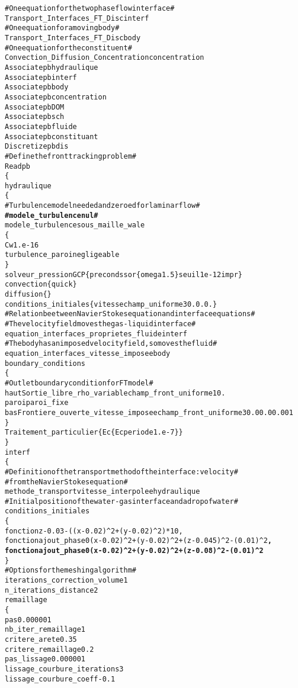 \begin{alltt}
# One equation for the two phase flow interface #
Transport_Interfaces_FT_Disc       interf
# One equation for a moving body #
Transport_Interfaces_FT_Disc       body
# One equation for the constituent #
Convection_Diffusion_Concentration concentration
Associate pb hydraulique
Associate pb interf
Associate pb body
Associate pb concentration
Associate pb DOM
Associate pb sch
Associate pb fluide
Associate pb constituant
Discretize pb dis
# Define the front tracking problem #
Read pb
\{
    hydraulique
    \{
        # Turbulence model needed and zeroed for laminar flow #
        {\bf{# modele_turbulence nul #}}
        modele_turbulence sous_maille_wale
        \{
            Cw               1.e-16
            turbulence_paroi negligeable
        \}
        solveur_pression GCP \{ precond ssor \{ omega 1.5 \} seuil 1e-12 impr \}
        convection           \{ quick \}
        diffusion            \{ \}
        conditions_initiales \{ vitesse champ_uniforme 3 0. 0. 0. \}
        # Relation beetween Navier Stokes equation and interface equations #
        # The velocity field moves the gas-liquid interface #
        equation_interfaces_proprietes_fluide interf 
        # The body has an imposed velocity field, so moves the fluid #
        equation_interfaces_vitesse_imposee   body
        boundary_conditions
        \{
            # Outlet boundary condition for FT model #
            haut   Sortie_libre_rho_variable champ_front_uniforme 1 0.    
            paroi  paroi_fixe
            bas    Frontiere_ouverte_vitesse_imposee champ_front_uniforme 3 0.0 0.0 0.001
        \}
        Traitement_particulier \{ Ec \{ Ec periode 1.e-7 \} \}
    \}
    interf
    \{
        # Definition of the transport method of the interface: velocity #
        # from the Navier Stokes equation #
        methode_transport vitesse_interpolee hydraulique
        # Initial position of the water-gas interface and a drop of water #
        conditions_initiales 
        \{
            fonction z-0.03-((x-0.02)^2+(y-0.02)^2)*10 ,
            fonction ajout_phase0 (x-0.02)^2+(y-0.02)^2+(z-0.045)^2-(0.01)^2 {\bf{,}}
            {\bf{fonction ajout_phase0 (x-0.02)^2+(y-0.02)^2+(z-0.08)^2-(0.01)^2 }}
        \}
        # Options for the meshing algorithm #
        iterations_correction_volume 1
        n_iterations_distance 2
        remaillage 
        \{
            pas 0.000001
            nb_iter_remaillage 1
            critere_arete 0.35
            critere_remaillage 0.2
            pas_lissage 0.000001
            lissage_courbure_iterations 3
            lissage_courbure_coeff -0.1

\end{alltt}
